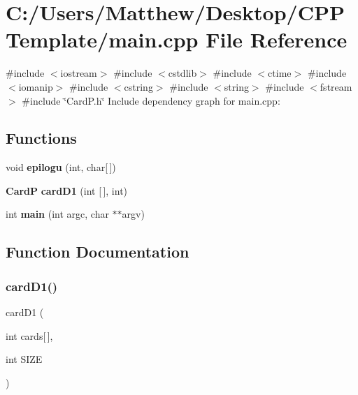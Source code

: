 \section{C\+:/\+Users/\+Matthew/\+Desktop/\+C\+P\+P\+Template/main.cpp File Reference}
\label{main_8cpp}
{\ttfamily \#include $<$iostream$>$}\newline
{\ttfamily \#include $<$cstdlib$>$}\newline
{\ttfamily \#include $<$ctime$>$}\newline
{\ttfamily \#include $<$iomanip$>$}\newline
{\ttfamily \#include $<$cstring$>$}\newline
{\ttfamily \#include $<$string$>$}\newline
{\ttfamily \#include $<$fstream$>$}\newline
{\ttfamily \#include \char`\"{}Card\+P.\+h\char`\"{}}\newline
Include dependency graph for main.\+cpp\+:
\subsection*{Functions}
\begin{DoxyCompactItemize}
\item 
void {\bf epilogu} (int, char[$\,$])
\item 
{\bf CardP} {\bf card\+D1} (int [$\,$], int)
\item 
int {\bf main} (int argc, char $\ast$$\ast$argv)
\end{DoxyCompactItemize}


\subsection{Function Documentation}
\label{main_8cpp_af9a13099718264d83ecff1fc07af9f2b} 
\subsubsection{card\+D1()}
{\footnotesize{} card\+D1 (\begin{DoxyParamCaption}\item[{int}]{cards[$\,$],  }\item[{int}]{S\+I\+ZE }\end{DoxyParamCaption})}




